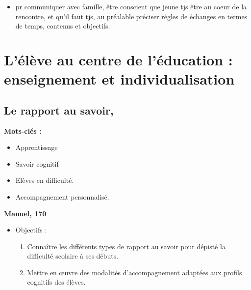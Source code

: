 \documentclass[12pt]{report}
\begin{document}
\begin{itemize}
\begin{itemize}
\item pr communiquer avec famille, être conscient que jeune tjs être au coeur de la rencontre, et qu'il faut tjs, au préalable préciser règles de échanges en termes de temps, contenus et objectifs.


\end{itemize}


\chapter{L'élève au centre de l'éducation : enseignement et individualisation}

\section{Le rapport au savoir, }

\textbf{Mots-clés : } \\

\begin{itemize}
\item Apprentissage
\item Savoir cognitif
\item Elèves en difficulté.
\item Accompagnement personnalisé. \\
\end{itemize}

\textbf{Manuel, 170}

\begin{itemize}
\item Objectifs : 
\begin{enumerate}
\item Connaître les différents types de rapport au savoir pour dépisté la difficulté scolaire à ses débuts. \\
\item Mettre en œuvre des modalités d'accompagnement adaptées aux profils cognitifs des élèves. \\
\end{enumerate}


\end{itemize}
\end{itemize}
\end{document}
